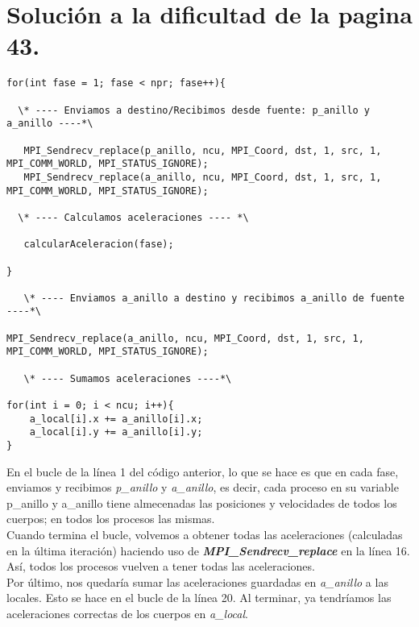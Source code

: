 \documentclass[11pt]{article}
\begin{document}
\newpage
\section{Solución a la dificultad de la pagina 43.}
\begin{lstlisting}[style=C]
for(int fase = 1; fase < npr; fase++){

  \* ---- Enviamos a destino/Recibimos desde fuente: p_anillo y a_anillo ----*\

   MPI_Sendrecv_replace(p_anillo, ncu, MPI_Coord, dst, 1, src, 1, MPI_COMM_WORLD, MPI_STATUS_IGNORE);
   MPI_Sendrecv_replace(a_anillo, ncu, MPI_Coord, dst, 1, src, 1, MPI_COMM_WORLD, MPI_STATUS_IGNORE);

  \* ---- Calculamos aceleraciones ---- *\

   calcularAceleracion(fase);

}
	
   \* ---- Enviamos a_anillo a destino y recibimos a_anillo de fuente ----*\

MPI_Sendrecv_replace(a_anillo, ncu, MPI_Coord, dst, 1, src, 1, MPI_COMM_WORLD, MPI_STATUS_IGNORE);

   \* ---- Sumamos aceleraciones ----*\

for(int i = 0; i < ncu; i++){
	a_local[i].x += a_anillo[i].x;
	a_local[i].y += a_anillo[i].y;
}
\end{lstlisting}
En el bucle de la línea 1 del código anterior, lo que se hace es que en cada fase, enviamos y recibimos \textit{p\_anillo} y \textit{a\_anillo}, es decir, cada proceso en su variable p\_anillo y a\_anillo tiene almecenadas las posiciones y velocidades de todos los cuerpos; en todos los procesos las mismas. \\

Cuando termina el bucle, volvemos a obtener todas las aceleraciones (calculadas en la última iteración) haciendo uso de \textbf{\textit{MPI\_Sendrecv\_replace}} en la línea 16. Así, todos los procesos vuelven a tener todas las aceleraciones. \\

Por último, nos quedaría sumar las aceleraciones guardadas en \textit{a\_anillo} a las locales. Esto se hace en el bucle de la línea 20. Al terminar, ya tendríamos las aceleraciones correctas de los cuerpos en \textit{a\_local}.
\end{document}
